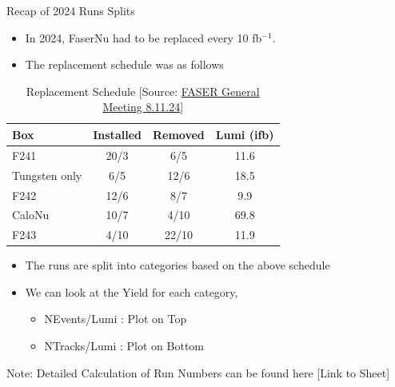 \begin{frame}{Recap of 2024 Runs Splits}
    \begin{itemize}
        \item In 2024, FaserNu had to be replaced every 10 fb$^{-1}$.
        \item The replacement schedule was as follows
    \end{itemize}
    \begin{table}[h!]
        \begin{tabular}{|l|c|c|c|}
            \hline
            \textbf{Box}  & \textbf{Installed} & \textbf{Removed} & \textbf{Lumi (ifb)} \\ \hline
            F241          & 20/3               & 6/5              & 11.6                \\ \hline
            Tungsten only & 6/5                & 12/6             & 18.5                \\ \hline
            F242          & 12/6               & 8/7              & 9.9                 \\ \hline
            CaloNu        & 10/7               & 4/10             & 69.8                \\ \hline
            F243          & 4/10               & 22/10            & 11.9                \\ \hline
        \end{tabular}
        \caption{Replacement Schedule [Source: \href{https://indico.cern.ch/event/1350805/contributions/5686417/attachments/2963344/5212652/FASER-GeneralMtg-8.11.24.pdf}{FASER General Meeting 8.11.24}]}
    \end{table}
	\vspace{-0.5cm}
    \begin{itemize}
        \item The runs are split into categories based on the above schedule
        \item We can look at the Yield for each category, 
		\begin{itemize}
			\item NEvents/Lumi : Plot on Top
			\item  NTracks/Lumi : Plot on Bottom
		\end{itemize}
    \end{itemize}
    \scriptsize{Note: Detailed Calculation of Run Numbers can be found here [Link to Sheet]}
\end{frame}

